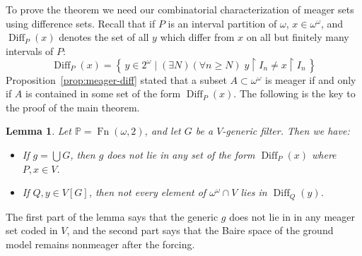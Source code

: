 \documentclass[11pt,oneside]{amsbook}
\newcommand{\set}[1]{\left\{\,#1\,\right\}}
\newcommand{\PP}{\mathbb P}
\DeclareMathOperator{\Diff}{Diff}
\DeclareMathOperator{\Fn}{Fn}
\theoremstyle{definition}
\theoremstyle{plain}
\newtheorem{lemma}[theorem]{Lemma}
\theoremstyle{definition}
\theoremstyle{remark}
\numberwithin{equation}{section}
\numberwithin{figure}{section}
\begin{document}
To prove the theorem we need our combinatorial characterization of meager sets using difference sets. Recall that if $P$ is an interval partition of $\omega$, $x\in\omega^\omega$, and $\Diff_P(x)$ denotes the set of all $y$ which differ from $x$ on all but finitely many intervals of $P$:
\[\Diff_P(x)=\set{y\in2^\omega\mid (\exists N)(\forall n\geq N)\;y\restriction I_n\neq x\restriction I_n}
\]
Proposition~\ref{prop:meager-diff} stated that a subset $A\subset\omega^\omega$ is meager if and only if $A$ is contained in some set of the form $\Diff_P(x)$. The following is the key to the proof of the main theorem.

\begin{lemma}
  \label{lem:cohen-meager}
  Let $\PP=\Fn(\omega,2)$, and let $G$ be a $V$-generic filter. Then we have:
  \begin{itemize}
    \item If $g=\bigcup G$, then $g$ does not lie in any set of the form $\Diff_P(x)$ where $P,x\in V$.
    \item If $Q,y\in V[G]$, then not every element of $\omega^\omega\cap V$ lies in $\Diff_Q(y)$.
  \end{itemize}
\end{lemma}

The first part of the lemma says that the generic $g$ does not lie in in any meager set coded in $V$, and the second part says that the Baire space of the ground model remains nonmeager after the forcing.
\end{document}
